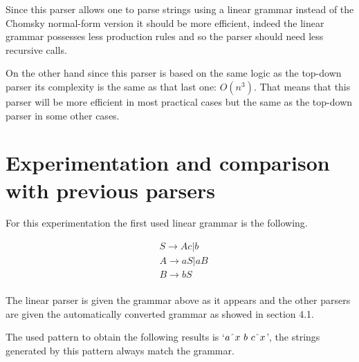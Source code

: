Since this parser allows one to parse strings using a linear grammar instead of the Chomsky normal-form version it should be more efficient, indeed the linear grammar possesses less production rules and so the parser should need less recursive calls.

On the other hand since this parser is based on the same logic as the top-down parser its complexity is the same as that last one: $O(n^3)$.
That means that this parser will be more efficient in most practical cases but the same as the top-down parser in some other cases.

\section{Experimentation and comparison with previous parsers}

For this experimentation the first used linear grammar is the following.

\begin{align*}
    &S \to Ac | b\\
    &A \to aS | aB\\
    &B \to bS\\
\end{align*}

The linear parser is given the grammar above as it appears and the other parsers are given the automatically converted grammar as showed in section 4.1.

The used pattern to obtain the following results is `$a\string^ x \text{ } b \text{ } c\string^ x$', the strings generated by this pattern always match the grammar.

